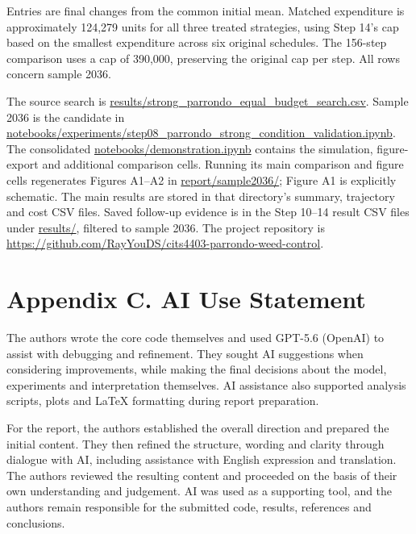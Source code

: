 \documentclass[a4paper,11pt]{article}
\begin{document}
Entries are final changes from the common initial mean. Matched expenditure is approximately 124,279 units for all three treated strategies, using Step 14's cap based on the smallest expenditure across six original schedules. The 156-step comparison uses a cap of 390,000, preserving the original cap per step. All rows concern sample 2036.

The source search is \url{results/strong_parrondo_equal_budget_search.csv}. Sample 2036 is the candidate in \url{notebooks/experiments/step08_parrondo_strong_condition_validation.ipynb}. The consolidated \url{notebooks/demonstration.ipynb} contains the simulation, figure-export and additional comparison cells. Running its main comparison and figure cells regenerates Figures A1--A2 in \url{report/sample2036/}; Figure A1 is explicitly schematic. The main results are stored in that directory's summary, trajectory and cost CSV files. Saved follow-up evidence is in the Step 10--14 result CSV files under \url{results/}, filtered to sample 2036. The project repository is \url{https://github.com/RayYouDS/cits4403-parrondo-weed-control}.

\clearpage
\section*{Appendix C. AI Use Statement}

The authors wrote the core code themselves and used GPT-5.6 (OpenAI) to assist with debugging and refinement. They sought AI suggestions when considering improvements, while making the final decisions about the model, experiments and interpretation themselves. AI assistance also supported analysis scripts, plots and LaTeX formatting during report preparation.

For the report, the authors established the overall direction and prepared the initial content. They then refined the structure, wording and clarity through dialogue with AI, including assistance with English expression and translation. The authors reviewed the resulting content and proceeded on the basis of their own understanding and judgement. AI was used as a supporting tool, and the authors remain responsible for the submitted code, results, references and conclusions.
\end{document}
